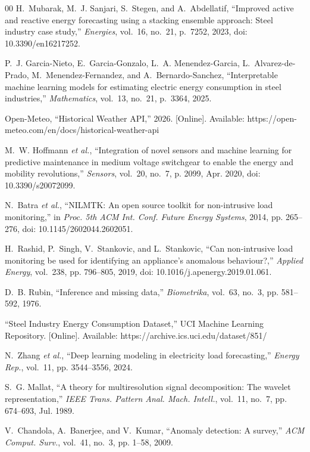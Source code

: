 \begin{thebibliography}{00}
H.~Mubarak, M.~J. Sanjari, S.~Stegen, and A.~Abdellatif,
``Improved active and reactive energy forecasting using a stacking
ensemble approach: Steel industry case study,''
\emph{Energies}, vol.~16, no.~21, p.~7252, 2023,
doi: 10.3390/en16217252.

P.~J. Garcia-Nieto, E.~Garcia-Gonzalo, L.~A. Menendez-Garcia,
L.~Alvarez-de-Prado, M.~Menendez-Fernandez, and A.~Bernardo-Sanchez,
``Interpretable machine learning models for estimating electric energy
consumption in steel industries,''
\emph{Mathematics}, vol.~13, no.~21, p.~3364, 2025.

Open-Meteo, ``Historical Weather API,'' 2026. [Online].
Available: https://open-meteo.com/en/docs/historical-weather-api

M.~W. Hoffmann \emph{et al.}, ``Integration of novel sensors and
machine learning for predictive maintenance in medium voltage switchgear
to enable the energy and mobility revolutions,''
\emph{Sensors}, vol.~20, no.~7, p. 2099, Apr. 2020,
doi: 10.3390/s20072099.

N.~Batra \emph{et al.}, ``NILMTK: An open source toolkit for
non-intrusive load monitoring,'' in \emph{Proc. 5th ACM Int. Conf.
Future Energy Systems}, 2014, pp. 265--276,
doi: 10.1145/2602044.2602051.

H.~Rashid, P.~Singh, V.~Stankovic, and L.~Stankovic, ``Can
non-intrusive load monitoring be used for identifying an appliance's
anomalous behaviour?,'' \emph{Applied Energy}, vol.~238, pp. 796--805,
2019, doi: 10.1016/j.apenergy.2019.01.061.

D.~B. Rubin, ``Inference and missing data,''
\emph{Biometrika}, vol.~63, no.~3, pp. 581--592, 1976.

``Steel Industry Energy Consumption Dataset,'' UCI Machine
Learning Repository. [Online]. Available:
https://archive.ics.uci.edu/dataset/851/

N.~Zhang \emph{et al.}, ``Deep learning modeling in electricity
load forecasting,''
\emph{Energy Rep.}, vol.~11, pp. 3544--3556,
2024.

S.~G. Mallat, ``A theory for multiresolution signal decomposition:
The wavelet representation,''
\emph{IEEE Trans. Pattern Anal.
Mach. Intell.}, vol.~11, no.~7, pp. 674--693, Jul. 1989.

V.~Chandola, A.~Banerjee, and V.~Kumar, ``Anomaly detection:
A survey,''
\emph{ACM Comput. Surv.}, vol.~41, no.~3, pp. 1--58,
2009.


\end{thebibliography}
